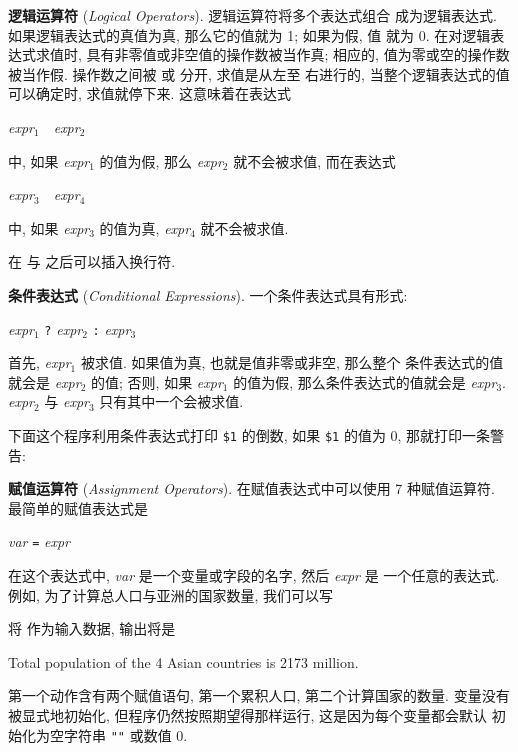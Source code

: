 \textbf{逻辑运算符} (\emph{Logical Operators}). 逻辑运算符将多个表达式组合
成为逻辑表达式. 如果逻辑表达式的真值为真, 那么它的值就为 1; 如果为假, 值
就为 0. 在对逻辑表达式求值时, 具有非零值或非空值的操作数被当作真; 相应的,
值为零或空的操作数被当作假. 操作数之间被 \AND  或 \OR 分开, 求值是从左至
右进行的, 当整个逻辑表达式的值可以确定时, 求值就停下来. 这意味着在表达式
\begin{pattern}
    \textit{expr}$_1$\ \AND\ \textit{expr}$_2$
\end{pattern}
中, 如果 \textit{expr}$_1$ 的值为假, 那么 \textit{expr}$_2$ 就不会被求值,
而在表达式
\begin{pattern}
    \textit{expr}$_3$\ \OR\ \textit{expr}$_4$
\end{pattern}
中, 如果 \textit{expr}$_3$  的值为真, \textit{expr}$_4$ 就不会被求值.

在 \AND  与 \OR 之后可以插入换行符.

\textbf{条件表达式} (\emph{Conditional Expressions}). 一个条件表达式具有形式:
\begin{pattern}
    \textit{expr}$_1$ \verb'?' \textit{expr}$_2$ \verb':' \textit{expr}$_3$
\end{pattern}
首先, \textit{expr}$_1$ 被求值. 如果值为真, 也就是值非零或非空, 那么整个
条件表达式的值就会是 \textit{expr}$_2$ 的值; 否则, 如果 \textit{expr}$_1$
的值为假, 那么条件表达式的值就会是 \textit{expr}$_3$. \textit{expr}$_2$ 与
\textit{expr}$_3$ 只有其中一个会被求值.

下面这个程序利用条件表达式打印 \verb'$1' 的倒数, 如果 \verb'$1' 的值为 0,
那就打印一条警告:

\textbf{赋值运算符} (\emph{Assignment Operators}). 在赋值表达式中可以使用 7
种赋值运算符. 最简单的赋值表达式是
\begin{pattern}
    \textit{var} \verb'=' \textit{expr}
\end{pattern}
在这个表达式中, \textit{var} 是一个变量或字段的名字, 然后 \textit{expr} 是
一个任意的表达式. 例如, 为了计算总人口与亚洲的国家数量, 我们可以写
将  作为输入数据, 输出将是
\begin{file}
    Total population of the 4 Asian countries is 2173 million.
\end{file}
第一个动作含有两个赋值语句, 第一个累积人口, 第二个计算国家的数量. 变量没有
被显式地初始化, 但程序仍然按照期望得那样运行, 这是因为每个变量都会默认
初始化为空字符串 \verb'""' 或数值 0.

